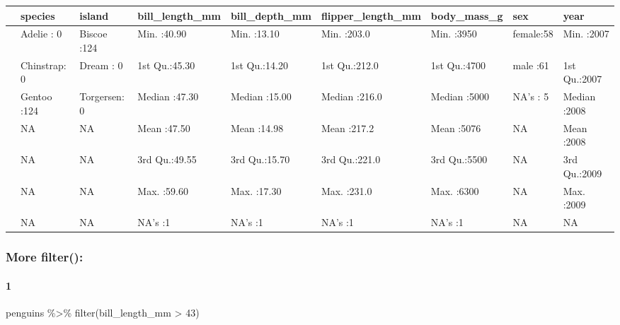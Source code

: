 \documentclass[
]{article}
\newenvironment{Shaded}{\begin{snugshade}}{\end{snugshade}}
\newcommand{\FunctionTok}[1]{\textcolor[rgb]{0.00,0.00,0.00}{#1}}
\newcommand{\NormalTok}[1]{#1}
\newcommand{\SpecialCharTok}[1]{\textcolor[rgb]{0.00,0.00,0.00}{#1}}
\newcommand{\StringTok}[1]{\textcolor[rgb]{0.31,0.60,0.02}{#1}}
\begin{document}
\begin{table}
\centering
\begin{tabular}{l|l|l|l|l|l|l|l|l}
\hline
  &      species &       island & bill\_length\_mm & bill\_depth\_mm & flipper\_length\_mm &  body\_mass\_g &     sex &      year\\
\hline
 & Adelie   :  0 & Biscoe   :124 & Min.   :40.90 & Min.   :13.10 & Min.   :203.0 & Min.   :3950 & female:58 & Min.   :2007\\
\hline
 & Chinstrap:  0 & Dream    :  0 & 1st Qu.:45.30 & 1st Qu.:14.20 & 1st Qu.:212.0 & 1st Qu.:4700 & male  :61 & 1st Qu.:2007\\
\hline
 & Gentoo   :124 & Torgersen:  0 & Median :47.30 & Median :15.00 & Median :216.0 & Median :5000 & NA's  : 5 & Median :2008\\
\hline
 & NA & NA & Mean   :47.50 & Mean   :14.98 & Mean   :217.2 & Mean   :5076 & NA & Mean   :2008\\
\hline
 & NA & NA & 3rd Qu.:49.55 & 3rd Qu.:15.70 & 3rd Qu.:221.0 & 3rd Qu.:5500 & NA & 3rd Qu.:2009\\
\hline
 & NA & NA & Max.   :59.60 & Max.   :17.30 & Max.   :231.0 & Max.   :6300 & NA & Max.   :2009\\
\hline
 & NA & NA & NA's   :1 & NA's   :1 & NA's   :1 & NA's   :1 & NA & NA\\
\hline
\end{tabular}
\end{table}

\hypertarget{more-filter}{%
\subsubsection{More filter():}\label{more-filter}}

\hypertarget{section}{%
\paragraph{1}\label{section}}

\begin{Shaded}
\begin{Highlighting}[]
\NormalTok{penguins }\SpecialCharTok{\%\textgreater{}\%} 
  \FunctionTok{filter}\NormalTok{(bill\_length\_mm }\SpecialCharTok{\textgreater{}} \StringTok{\textquotesingle{}43\textquotesingle{}}\NormalTok{)}
\end{Highlighting}
\end{Shaded}
\end{document}
